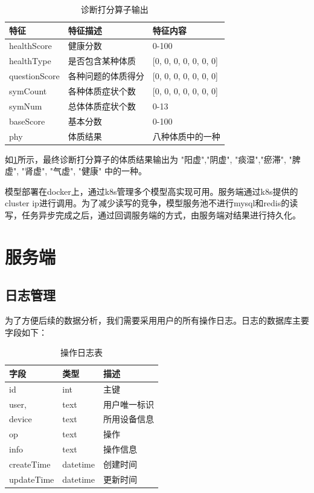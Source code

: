 \begin{table}[]
    \begin{tabular}{lll}
        \toprule
        特征 & 特征描述 & 特征内容 \\ 
        \midrule
        healthScore & 健康分数 & 0-100 \\
        healthType & 是否包含某种体质 & {[}0, 0, 0, 0, 0, 0, 0{]} \\ 
        questionScore & 各种问题的体质得分 & {[}0, 0, 0, 0, 0, 0, 0{]} \\
        symCount & 各种体质症状个数 & {[}0, 0, 0, 0, 0, 0, 0{]} \\
        symNum & 总体体质症状个数 & 0-13 \\
        baseScore & 基本分数 & 0-100 \\
        phy & 体质结果 & 八种体质中的一种\\
        \bottomrule
    \end{tabular}
    \caption{诊断打分算子输出}
    \label{tab:diag-feature}
\end{table}


如\ref{tab:diag-feature}所示，最终诊断打分算子的体质结果输出为 "阳虚","阴虚", "痰湿","瘀滞", "脾虚", "肾虚", "气虚", "健康" 中的一种。

模型部署在docker上，通过k8s管理多个模型高实现可用。服务端通过k8s提供的cluster ip进行调用。为了减少读写的竞争，模型服务池不进行mysql和redis的读写，任务异步完成之后，通过回调服务端的方式，由服务端对结果进行持久化。

\section{服务端}

\subsection{日志管理}
为了方便后续的数据分析，我们需要采用用户的所有操作日志。日志的数据库主要字段如下：


\begin{table}[]
    \begin{tabular}{lll}
        \toprule
        字段 & 类型 & 描述 \\ 
        \midrule
        id & int & 主键 \\
        user, & text & 用户唯一标识 \\ 
        device & text & 所用设备信息 \\
        op & text & 操作 \\
        info & text & 操作信息 \\
        createTime & datetime & 创建时间 \\
        updateTime & datetime & 更新时间\\
        \bottomrule
    \end{tabular}
    \caption{操作日志表}
    \label{tab:op_log}
\end{table}


